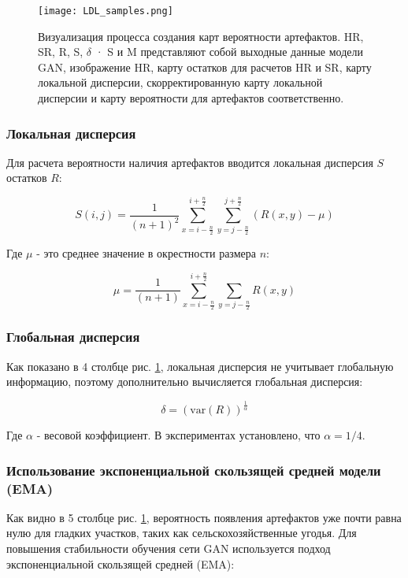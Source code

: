 \documentclass[14pt]{extarticle}
\begin{document}
\begin{figure}
    \centering
    \texttt{[image: LDL\_samples.png]}
    \caption{Визуализация процесса создания карт вероятности артефактов. HR, SR, R, S, $\delta$ · S и M представляют собой выходные данные модели GAN, изображение HR, карту остатков для расчетов HR и SR, карту локальной дисперсии, скорректированную карту локальной дисперсии и карту вероятности для артефактов соответственно.}
    \label{fig:LDL_samples}
\end{figure}

\subsubsection{Локальная дисперсия}

Для расчета вероятности наличия артефактов вводится локальная дисперсия $S$ остатков $R$:

$$
S(i,j) = \frac{1}{(n+1)^2} \sum_{x=i-\frac{n}{2}}^{i+\frac{n}{2}} \sum_{y=j-\frac{n}{2}}^{j+\frac{n}{2}} (R(x,y) - \mu)
$$

Где $\mu$ - это среднее значение в окрестности размера $n$:

$$
\mu = \frac{1}{(n+1)} \sum_{x=i-\frac{n}{2}}^{i+\frac{n}{2}} \sum_{y=j-\frac{n}{2}} R(x,y)
$$

\subsubsection{Глобальная дисперсия}

Как показано в 4 столбце рис. \ref{fig:LDL_samples}, локальная дисперсия не учитывает глобальную информацию, поэтому дополнительно вычисляется глобальная дисперсия:

$$
\delta = \left(\text{var}(R)\right)^{\frac{1}{\alpha}}
$$

Где $\alpha$ - весовой коэффициент. В экспериментах установлено, что $\alpha = 1/4$.

\subsubsection{Использование экспоненциальной скользящей средней модели (EMA)}

Как видно в 5 столбце рис. \ref{fig:LDL_samples}, вероятность появления артефактов уже почти равна нулю для гладких участков, таких как сельскохозяйственные угодья. Для повышения стабильности обучения сети GAN используется подход экспоненциальной скользящей средней (EMA):
\end{document}
